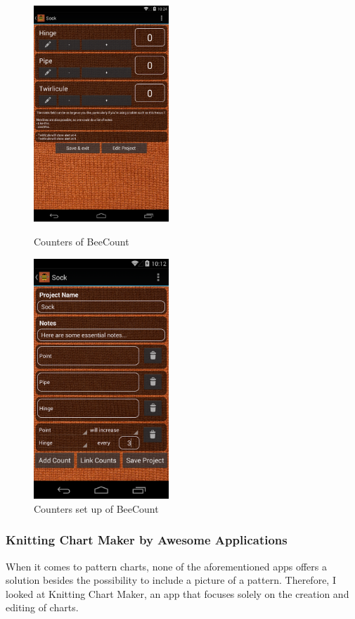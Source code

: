 \documentclass[a4paper,11pt]{kth-mag}
\begin{document}
\begin{figure}[H]
\centering
\begin{minipage}{.5\textwidth}
  \centering
  \includegraphics[width=2in]{images/image01.png}
  \caption{Counters of BeeCount}
  \label{fig_beecount1}
\end{minipage}%
\begin{minipage}{.5\textwidth}
  \centering
  \includegraphics[width=2in]{images/image07.png}
  \caption{Counters set up of BeeCount}
  \label{fig_beecount2}
\end{minipage}
\end{figure}


\subsubsection{Knitting Chart Maker by Awesome Applications}
When it comes to pattern charts, none of the aforementioned apps offers a
solution besides the possibility to include a picture of a pattern. Therefore, I
looked at Knitting Chart Maker, an app that focuses solely on the creation and
editing of charts.
\end{document}
